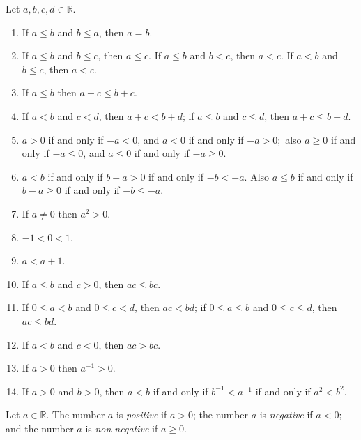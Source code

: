 \begin{lemma} %
	\label{rpr:l:rprops}
	Let $a, b, c, d \in \mathbb{R}$.
	\begin{enumerate}
		\item \label{rpr:l:rprops:1}
		      If $a \leq b$ and $b \leq a$, then $a = b$.
		\item \label{rpr:l:rprops:2}
		      If $a \leq b$ and $b \leq c$, then $a \leq c$. If $a \leq b$ and $b <c $, then $a < c$. If $a < b$ and $b \leq c$, then $a < c$.
		\item \label{rpr:l:rprops:3}
		      If $a \leq b$ then $a + c \leq b + c$.
		\item \label{rpr:l:rprops:4}
		      If $a < b$ and $c < d$, then $a + c < b + d$; if $a \leq b$ and $c \leq d$, then $a + c \leq b + d$.
		\item \label{rpr:l:rprops:5}
		      $a > 0$ if and only if $-a < 0$, and $a < 0$ if and only if $-a > 0 ;$ also $a \geq 0$ if and only if $-a \leq 0$, and $a \leq 0$ if and only if $-a \geq 0$.
		\item \label{rpr:l:rprops:6}
		      $a < b$ if and only if $b - a > 0$ if and only if $-b < -a$. Also $a \leq b$ if and only if $b - a \geq 0$ if and only if $-b \leq -a$.
		\item \label{rpr:l:rprops:7}
		      If $a \neq 0$ then $a^{2} > 0$.
		\item \label{rpr:l:rprops:8}
		      $-1 < 0 < 1$.
		\item \label{rpr:l:rprops:9}
		      $a < a + 1$.
		\item \label{rpr:l:rprops:10}
		      If $a \leq b$ and $c > 0$, then $a c \leq b c$.
		\item \label{rpr:l:rprops:11}
		      If $0 \leq a < b$ and $0 \leq c < d$, then $a c < b d$; if $0 \leq a \leq b$ and $0 \leq c \leq d$, then $a c \leq b d$.
		\item \label{rpr:l:rprops:12}
		      If $a < b$ and $c < 0$, then $a c > b c$.
		\item \label{rpr:l:rprops:13}
		      If $a > 0$ then $a^{-1} > 0$.
		\item \label{rpr:l:rprops:14}
		      If $a > 0$ and $b > 0$, then $a < b$ if and only if $b^{-1} < a^{-1}$ if and only if $a^{2} < b^{2}$.
	\end{enumerate}
\end{lemma}

\begin{definition} %
	Let $a \in \mathbb{R}$. The number $a$ is \emph{positive} if $a > 0$; the number $a$ is \emph{negative} if $a < 0$; and the number $a$ is \emph{non-negative} if $a \geq 0$.
\end{definition}

